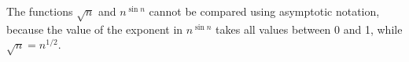 The functions $\!\sqrt{n}$ and $n^{\sin n}$ cannot be compared using asymptotic notation, because the value of the exponent in $n^{\sin n}$ takes all values between 0 and 1, while $\!\sqrt{n}=n^{1/2}$.

